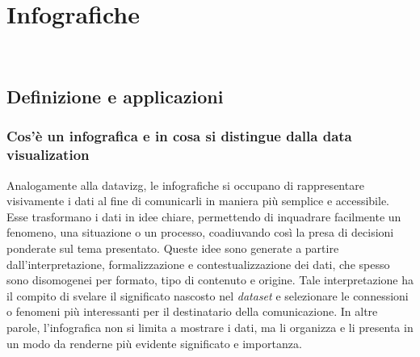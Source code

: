\chapter{Infografiche}
\label{cap:studio_infografiche}
\\

\section{Definizione e applicazioni}
\subsection{Cos'è un infografica e in cosa si distingue dalla data visualization}
Analogamente alla \gls{datavizg}, le infografiche si occupano di rappresentare visivamente i dati al fine di comunicarli in maniera più semplice e accessibile.
Esse trasformano i dati in idee chiare, permettendo di inquadrare facilmente un fenomeno, una situazione o un processo, coadiuvando così la presa di decisioni ponderate sul tema presentato.
Queste idee sono generate a partire dall'interpretazione, formalizzazione e contestualizzazione dei dati, che spesso sono disomogenei per formato, tipo di contenuto e origine. Tale interpretazione ha il compito di 
svelare il significato nascosto nel \emph{dataset} e selezionare le connessioni o fenomeni più interessanti per il destinatario della comunicazione.
In altre parole, l'infografica non si limita a mostrare i dati, ma li organizza e li presenta in un modo da renderne più evidente significato e importanza.


